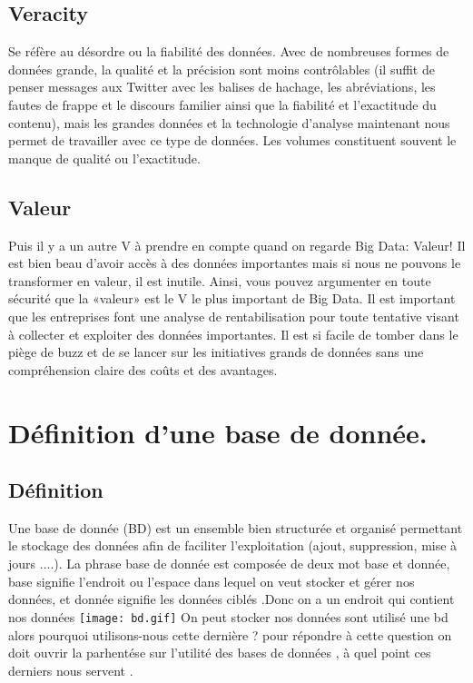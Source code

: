 \documentclass[11pt,twoside,openany,x11names,svgnames]{memoir}
\begin{document}
				\subsection{Veracity}
				 \normalsize Se réfère au désordre ou la fiabilité des données. Avec de nombreuses formes de données grande, la qualité et la précision sont moins contrôlables (il suffit de penser messages aux Twitter avec les balises de hachage, les abréviations, les fautes de frappe et le discours familier ainsi que la fiabilité et l'exactitude du contenu), mais les grandes données et la technologie d'analyse maintenant nous permet de travailler avec ce type de données. Les volumes constituent souvent le manque de qualité ou l'exactitude.
				\subsection{Valeur}
				\normalsize Puis il y a un autre V à prendre en compte quand on regarde Big Data: Valeur! Il est bien beau d'avoir accès à des données importantes mais si nous ne pouvons le transformer en valeur, il est inutile. Ainsi, vous pouvez argumenter en toute sécurité que la «valeur» est le V le plus important de Big Data. Il est important que les entreprises font une analyse de rentabilisation pour toute tentative visant à collecter et exploiter des données importantes. Il est si facile de tomber dans le piège de buzz et de se lancer sur les initiatives grands de données sans une compréhension claire des coûts et des avantages.

				
		\section{Définition d'une base de donnée.}
\subsection{Définition}
\normalsize Une base de donnée (BD) est un ensemble bien structurée et organisé permettant le stockage des données
afin de faciliter l’exploitation (ajout, suppression, mise à jours ....). 
La phrase base de donnée est composée de deux mot base et donnée, base signifie l'endroit ou l'espace dans lequel on veut stocker et gérer nos données, et donnée signifie les données ciblés .Donc on a un endroit qui contient nos données 
\texttt{[image: bd.gif]} 
\normalsize On peut stocker nos données sont utilisé une bd alors pourquoi utilisons-nous cette dernière ?
pour répondre à cette question on doit ouvrir la parhentése sur l'utilité des bases de données , à quel point ces derniers nous servent .\paragraph{}                                                                    
\end{document}
